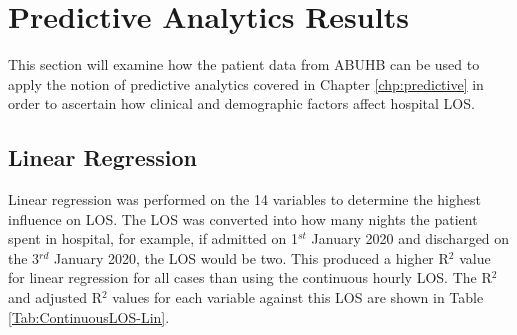 \documentclass[../thesis.tex]{subfiles}
\begin{document}
\section{Predictive Analytics Results}\label{sec:predictiveresults}
This section will examine how the patient data from ABUHB can be used to apply the notion of predictive analytics covered in Chapter \ref{chp:predictive} in order to ascertain how clinical and demographic factors affect hospital LOS.

\subsection{Linear Regression}\label{sec:linregresults}
Linear regression was performed on the 14 variables to determine the highest influence on LOS. The LOS was converted into how many nights the patient spent in hospital, for example, if admitted on 1$^{st}$ January 2020 and discharged on the 3$^{rd}$ January 2020, the LOS would be two. This produced a higher R$^{2}$ value for linear regression for all cases than using the continuous hourly LOS. The R$^{2}$ and adjusted R$^{2}$ values for each variable against this LOS are shown in Table \ref{Tab:ContinuousLOS-Lin}.


\begin{table}[h!]
\centering{}
\caption{The results for the linear regression when run against the continuous and categorical variables within the ABUHB data set. The $R^{2}$ and Adjusted $R^{2}$ values are given.}
\label{Tab:ContinuousLOS-Lin}
\end{table}
\end{document}
